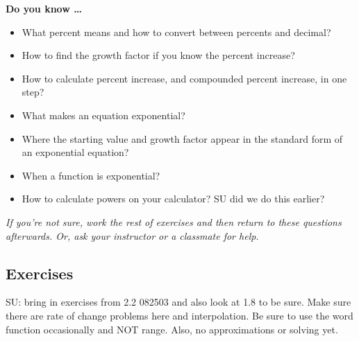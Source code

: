 \bigskip

\noindent \textbf{Do you know \ldots}

\begin{itemize}
\item What percent means and how to convert between percents and decimal?
\item How to find the growth factor if you know the percent increase?
\item How to calculate percent increase, and compounded percent increase, in one step?
\item What makes an equation exponential?
\item Where the starting value and growth factor appear in the standard form of an exponential equation?
\item When a function is exponential?
\item How to calculate powers on your calculator?  SU did we do this earlier?
\end{itemize}

\noindent \emph{If you're not sure, work the rest of exercises and then return to these questions afterwards.  Or, ask your instructor or a classmate for help.}

\subsection*{Exercises}

SU:  bring in exercises from 2.2 082503 and also look at 1.8 to be sure.  Make sure there are rate of change problems here and interpolation.  Be sure to use the word function occasionally and NOT range.  Also, no approximations or solving yet.

